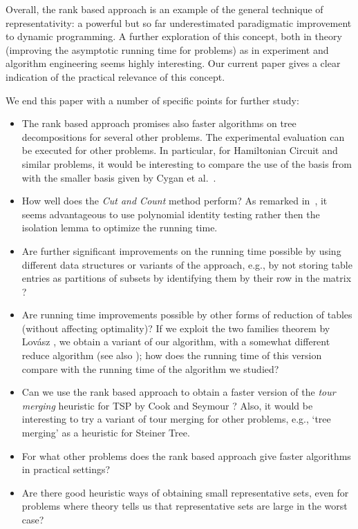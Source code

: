 \documentclass{llncs}
\begin{document}
Overall, the rank based approach is an example of the general technique of representativity: a powerful but
so far underestimated paradigmatic improvement to dynamic programming. A further exploration of this
concept, both in theory (improving the asymptotic running time for problems) as in experiment and
algorithm engineering seems highly interesting. Our current paper gives a clear indication of the practical
relevance of this concept.

We end this paper with a number of specific points for further study:
\begin{itemize}
\item The rank based approach promises also faster algorithms on tree decompositions for several other 
problems. The experimental evaluation can be executed for other problems. In particular, for
{\sc Hamiltonian Circuit} and similar problems, it would be interesting to compare the
use of the basis from \cite{BodlaenderCKN12} with  the smaller basis
given by Cygan et al.~\cite{CyganKN12}.
\item How well does the \emph{Cut and Count} method perform? 
As remarked in~\cite{CyganNPPRW11}, it seems advantageous to use polynomial identity testing rather then the isolation lemma to optimize the running time.
\item Are further significant improvements on the running time possible by using different data structures
or variants of the approach, e.g., by not storing table entries as partitions of subsets by identifying them
by their row in the matrix ? 
\item Are running time improvements possible by other forms of reduction of tables (without affecting 
optimality)? If we exploit the two families theorem by Lov\'{a}sz \cite{Lovasz77},
we obtain a variant of our algorithm, with a somewhat different reduce algorithm \cite{FominLS13} (see
also \cite{Marx09}); how does the running time of this version compare with the running time
of the algorithm we studied?
\item Can we use the rank based approach to obtain a faster version of
the {\em tour merging} heuristic for TSP by Cook
and Seymour \cite{CookS03}? Also, it would be interesting to try a variant of tour merging 
for other problems, e.g., `tree merging' as a heuristic for {\sc Steiner Tree}.
\item For what other problems does the rank based approach give faster algorithms in
practical settings? 
\item Are there good heuristic ways of obtaining small representative sets, even for problems where
theory tells us that representative sets are large in the worst case?
\end{itemize}






\end{document}
